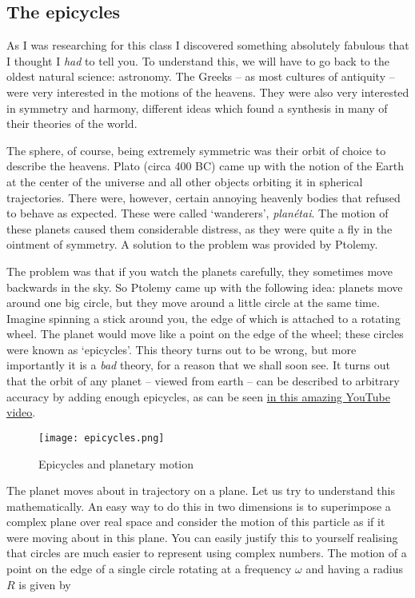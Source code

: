 \subsection{The epicycles}

As I was researching for this class I discovered something absolutely fabulous that I thought I \textit{had} to tell you. To understand this, we will have to go back to the oldest natural science: astronomy. The Greeks -- as most cultures of antiquity -- were very interested in the motions of the heavens. They were also very interested in symmetry and harmony, different ideas which found a synthesis in many of their theories of the world. 

The sphere, of course, being extremely symmetric was their orbit of choice to describe the heavens. Plato (circa 400 BC) came up with the notion of the Earth at the center of the universe and all other objects orbiting it in spherical trajectories. There were, however, certain annoying heavenly bodies that refused to behave as expected. These were called `wanderers', \textit{planétai}. The motion of these planets caused them considerable distress, as they were quite a fly in the ointment of symmetry. A solution to the problem was provided by Ptolemy.

The problem was that if you watch the planets carefully, they sometimes move backwards in the sky. So Ptolemy came up with the following idea: planets move around one big circle, but they move around a little circle at the same time. Imagine spinning a stick around you, the edge of which is attached to a rotating wheel. The planet would move like a point on the edge of the wheel; these circles were known as `epicycles'. This theory turns out to be wrong, but more importantly it is a \textit{bad} theory, for a reason that we shall soon see. It turns out that the orbit of any planet -- viewed from earth -- can be described to arbitrary accuracy by adding enough epicycles, as can be seen \href{https://www.youtube.com/watch?v=QVuU2YCwHjw}{in this amazing YouTube video}.

\begin{figure}[!htb]
\centering
\texttt{[image: epicycles.png]}
\caption{Epicycles and planetary motion}
\label{epicycles}
\end{figure}

The planet moves about in trajectory on a plane. Let us try to understand this mathematically. An easy way to do this in two dimensions is to superimpose a complex plane over real space and consider the motion of this particle as if it were moving about in this plane. You can easily justify this to yourself realising that circles are much easier to represent using complex numbers. The motion of a point on the edge of a single circle rotating at a frequency $\omega$ and having a radius $R$ is given by

